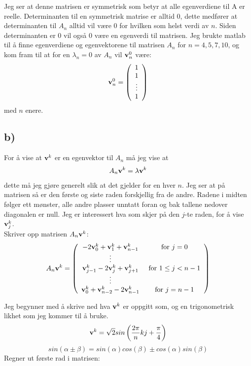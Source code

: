 \documentclass[a4paper,12pt,norsk]{article}
\begin{document}
Jeg ser at denne matrisen er symmetrisk som betyr at alle egenverdiene til A er reelle. Determinanten til en symmetrisk matrise er alltid 0, dette medfører at determinanten til $A_n$ alltid vil være 0 for hvilken som helst verdi av $n$. Siden determinanten er 0 vil også 0 være en egenverdi til matrisen. Jeg brukte matlab til å finne egenverdiene og egenvektorene til matrisen $A_n$ for $n = 4,5,7,10$, og kom fram til at for en $\lambda_n = 0$ av $A_n$ vil $\bold{v}^0_n$ være:
$$\bold{v}^0_n = \left({\begin{array}{cc} 1\\1\\ \vdots \\ 1\end{array}}\right) $$
med $n$ enere.

\subsection{b)}
For å vise at $\bold{v}^k$ er en egenvektor til $A_n$ må jeg vise at 
$$A_n\bold{v}^k = \lambda\bold{v}^k $$
dette må jeg gjøre generelt slik at det gjelder for en hver $n$. Jeg ser at på matrisen så er den første og siste raden forskjellig fra de andre. Radene i midten følger ett mønster, alle andre plasser unntatt foran og bak tallene nedover diagonalen er null. Jeg er interessert hva som skjer på den $j$-te raden, for å vise $\bold{v}^k_j$. \\
Skriver opp matrisen $A_n\bold{v}^k$:
\begin{align*}
A_n\bold{v}^k = \left({\begin{array}{cc} -2\bold{v}^{k}_{0} + \bold{v}^{k}_{1} + \bold{v}^{k}_{n-1} &\text{ for } j=0 \\ 
\vdots \\ 
\bold{v}^{k}_{j-1} -2\bold{v}^{k}_{j}+\bold{v}^{k}_{j+1} &\text{ for } 1\leq j < n-1\\ 
\vdots \\ 
\bold{v}^{k}_{0} + \bold{v}^{k}_{n-2} -2\bold{v}^{k}_{n-1} &\text{ for } j = n-1\end{array}}\right)
\end{align*}

Jeg begynner med å skrive ned hva $\bold{v}^k$ er oppgitt som, og en trigonometrisk likhet som jeg kommer til å bruke.
$$\bold{v}^k = \sqrt{2}sin\left(\frac{2\pi}{n}kj+\frac{\pi}{4}\right)$$ $$sin(\alpha \pm \beta) = sin(\alpha)cos(\beta) \pm cos(\alpha)sin(\beta)$$
Regner ut første rad i matrisen:
\end{document}
